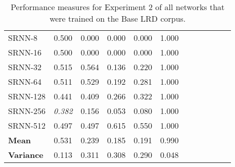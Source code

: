 \begin{table}[t]
\begin{tabularx}{\textwidth}{@{}l*{10}{C}c@{}}
   SRNN-8 &     0.500 &      0.000 &   0.000 &     0.000 &    1.000 \\
  SRNN-16 &     0.500 &      0.000 &   0.000 &     0.000 &    1.000 \\
  SRNN-32 &     0.515 &      0.564 &   0.136 &     0.220 &    1.000 \\
  SRNN-64 &     0.511 &      0.529 &   0.192 &     0.281 &    1.000 \\
 SRNN-128 &     0.441 &      0.409 &   0.266 &     0.322 &    1.000 \\
 SRNN-256 &     \textit{0.382} &      0.156 &   0.053 &     0.080 &    1.000 \\
 SRNN-512 &     0.497 &      0.497 &   0.615 &     0.550 &    1.000 \\
 \midrule
 \midrule
 \textbf{Mean} & 0.531 & 0.239 & 0.185 & 0.191 & 0.990 \\
 \textbf{Variance} & 0.113 & 0.311 & 0.308 & 0.290 & 0.048 \\
\bottomrule
\end{tabularx}
\caption[Experiment 2: Base LRD network performance]{Performance measures for Experiment 2 of all networks that were trained on the Base LRD corpus.}
\label{tab:perf_NDbase}
\end{table}